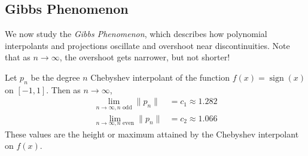 \subsection{Gibbs Phenomenon}
We now study the \emph{Gibbs Phenomenon}, which describes how polynomial interpolants and projections oscillate and overshoot near discontinuities. Note that as $n \rightarrow \infty$, the overshoot gets narrower, but not shorter!
\begin{theorem}
  Let $p_n$ be the degree $n$ Chebyshev interpolant of the function $f(x) = \operatorname{sign}(x)$ on $[-1, 1]$. Then as $n \rightarrow \infty$,
  \begin{align*}
    \lim_{n \rightarrow \infty, n \text{ odd}} \|p_n \| &= c_1 \approx 1.282 \\ 
    \lim_{n \rightarrow \infty, n \text{ even}} \|p_n \| &= c_2 \approx 1.066
  \end{align*}
  These values are the height or maximum attained by the Chebyshev interpolant on $f(x)$.
\end{theorem}

